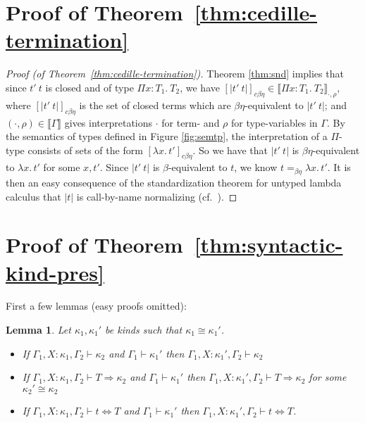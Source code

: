 \documentclass{article}
\newcommand{\interp}[1]{\llbracket #1 \rrbracket}
\newcommand{\tpsynth}[0]{\Rightarrow}
\newtheorem{lemma}[theorem]{Lemma}
\begin{document}
\section{Proof of Theorem~\ref{thm:cedille-termination}}
\begin{proof}[Proof (of Theorem~\ref{thm:cedille-termination})]
Theorem \ref{thm:snd} implies that since
$t'\ t$ is closed and of type $\Pi x:T_1.\ T_2$, we have
$[|t'\ t|]_{c\beta\eta}\in \interp{\Pi x:T_1.\ T_2}_{\cdot,\rho}$,
where $[|t'\ t|]_{c\beta\eta}$ is the set of closed terms which are
$\beta\eta$-equivalent to $|t'\ t|$; and
$(\cdot,\rho)\in\interp{\Gamma}$ gives interpretations $\cdot$ for
term- and $\rho$ for type-variables in $\Gamma$.  By the semantics of
types defined in Figure \ref{fig:semtp}, the
interpretation of a $\Pi$-type consists of sets of the form
$[\lambda x.\,t']_{c\beta\eta}$.  So we have that $|t'\ t|$ is $\beta\eta$-equivalent to
$\lambda x.\, t'$ for some $x, t'$.  
Since $|t'\ t|$ is $\beta$-equivalent to $t$, we know $t =_{\beta\eta} \lambda x.\, t'$.
It is then an easy consequence of the
standardization theorem for untyped lambda calculus that $|t|$ is
call-by-name normalizing (cf.~\cite{Kashima2000}).
\end{proof}

\section{Proof of Theorem~\ref{thm:syntactic-kind-pres}}
\label{sec:proof-syntactic-kind-pres}

First a few lemmas (easy proofs omitted):

\begin{lemma}
  \label{lem:ctxt-conv-class}
  Let \(\kappa_1,\kappa_1'\) be kinds such that \(\kappa_1 \cong \kappa_1'\).
  \begin{itemize}
  \item If \(\Gamma_1,X:\kappa_1,\Gamma_2 \vdash \kappa_2\) and \(\Gamma_1
    \vdash \kappa_1'\) then \(\Gamma_1,X:\kappa_1',\Gamma_2 \vdash \kappa_2\)
   
  \item If \(\Gamma_1,X:\kappa_1,\Gamma_2 \vdash T \tpsynth \kappa_2\) and
    \(\Gamma_1 \vdash \kappa_1'\) then \(\Gamma_1,X:\kappa_1',\Gamma_2 \vdash T
    \tpsynth \kappa_2\) for some \(\kappa_2' \cong \kappa_2\)

    
  \item If \(\Gamma_1,X:\kappa_1,\Gamma_2 \vdash t \Leftrightarrow T\) and
    \(\Gamma_1 \vdash \kappa_1'\) then \(\Gamma_1,X:\kappa_1',\Gamma_2 \vdash t
    \Leftrightarrow T\).
  \end{itemize}
\end{lemma}
\end{document}
